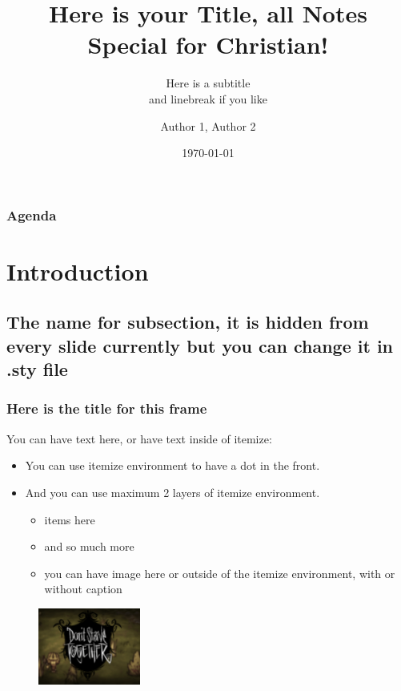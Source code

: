 \documentclass[aspectratio=169]{beamer}
\title[here is short]{Here is your Title, all Notes Special for Christian!}
\subtitle{Here is a subtitle \\ and linebreak if you like}
\author{Author 1, Author 2}
\institute{Department of Informatics\\Your Uni}
\date{\today}
\begin{document}
\begin{frame}
	\titlepage
\end{frame}

\begin{frame}
	\frametitle{Agenda}
	\tableofcontents
\end{frame}

\section{Introduction}
\subsection{The name for subsection, it is hidden from every slide currently but you can change it in .sty file}

\begin{frame}[fragile]
	\frametitle{Here is the title for this frame}
	You can have text here, or have text inside of itemize:
	\begin{itemize}
	    \item You can use itemize environment to have a dot in the front. 
	    \item And you can use maximum 2 layers of itemize environment. 
	    \begin{itemize}
	        \item items here
	        \item and so much more
	        \item you can have image here or outside of the itemize environment, with or without caption
	    \end{itemize}
	\end{itemize}
	
	\begin{figure}
        \centering
        \includegraphics[width=0.3\textwidth]{images/dst.png} 
    \end{figure}
\end{frame}
\end{document}

